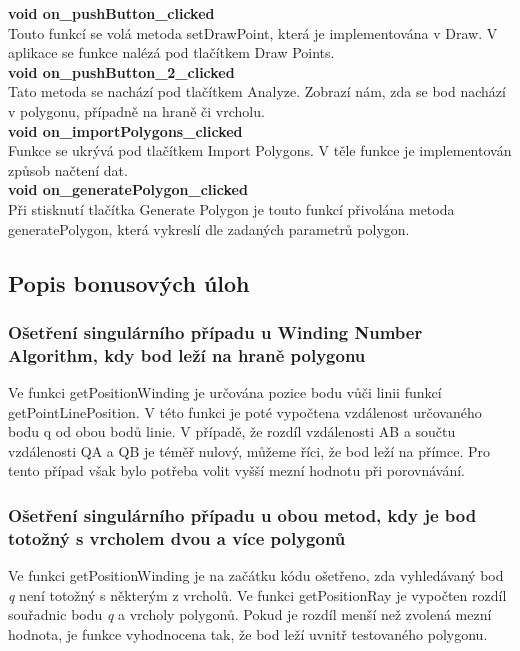 \documentclass[a4paper, 12pt]{article}
\begin{document}
\textbf{void on\_pushButton\_clicked}\\
Touto funkcí se volá metoda setDrawPoint, která je implementována v Draw. V aplikace se funkce nalézá pod tlačítkem Draw Points. \\

\textbf{void on\_pushButton\_2\_clicked}\\
Tato metoda se nachází pod tlačítkem Analyze. Zobrazí nám, zda se bod nachází v polygonu, případně na hraně či vrcholu.\\

\textbf{void on\_importPolygons\_clicked}\\
Funkce se ukrývá pod tlačítkem Import Polygons. V těle funkce je implementován způsob načtení dat.\\

\textbf{void on\_generatePolygon\_clicked}\\
Při stisknutí tlačítka Generate Polygon je touto funkcí přivolána metoda generatePolygon, která vykreslí dle zadaných parametrů polygon.



\subsection{Popis bonusových úloh}
\subsubsection{Ošetření singulárního případu u Winding Number Algorithm, kdy bod leží na hraně polygonu}
Ve funkci getPositionWinding je určována pozice bodu vůči linii funkcí getPointLinePosition. V této funkci je poté vypočtena vzdálenost určovaného bodu q od obou bodů linie. V případě, že rozdíl vzdálenosti AB a součtu vzdálenosti QA a QB je téměř nulový, můžeme říci, že bod leží na přímce. Pro tento případ však bylo potřeba volit vyšší mezní hodnotu při porovnávání. 

\subsubsection{Ošetření singulárního případu u obou metod, kdy je bod totožný s vrcholem dvou a více polygonů}
Ve funkci getPositionWinding je na začátku kódu ošetřeno, zda vyhledávaný bod \textit{q} není totožný s některým z vrcholů. Ve funkci getPositionRay je vypočten rozdíl souřadnic bodu \textit{q} a vrcholy polygonů. Pokud je rozdíl menší než zvolená mezní hodnota, je funkce vyhodnocena tak, že bod leží uvnitř testovaného polygonu.
\end{document}
